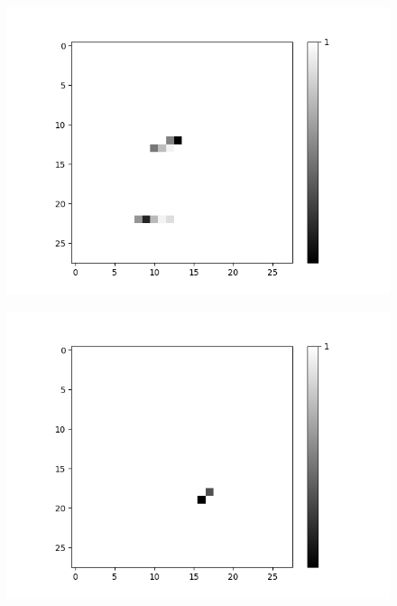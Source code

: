 \begin{figure}[H]
\begin{minipage}[b]{0.19\textwidth}
		\includegraphics[width=\textwidth]{LoAE(AND)(20LF)/True/Feature-10.png}
		\label{}
	\end{minipage}
	\begin{minipage}[b]{0.19\textwidth}
		\includegraphics[width=\textwidth]{LoAE(AND)(20LF)/True/Feature-12.png}
		\label{}
	\end{minipage}
	\begin{minipage}[b]{0.19\textwidth}

\end{minipage}
\end{figure}
